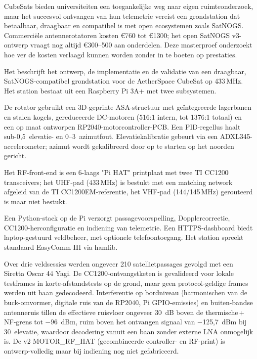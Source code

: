 
CubeSats bieden universiteiten een toegankelijke weg naar eigen ruimteonderzoek, maar het succesvol ontvangen van hun telemetrie vereist een grondstation dat betaalbaar, draagbaar en compatibel is met open ecosystemen zoals SatNOGS. Commerciële antennerotatoren kosten \euro{}760 tot \euro{}1300; het open SatNOGS v3-ontwerp vraagt nog altijd \euro{}300--500 aan onderdelen. Deze masterproef onderzoekt hoe ver de kosten verlaagd kunnen worden zonder in te boeten op prestaties.

Het beschrijft het ontwerp, de implementatie en de validatie van een draagbaar, SatNOGS-compatibel grondstation voor de AetherSpace CubeSat op 433\,MHz. Het station bestaat uit een Raspberry Pi 3A+ met twee subsystemen.

De rotator gebruikt een 3D-geprinte ASA-structuur met geïntegreerde lagerbanen en stalen kogels, gereduceerde DC-motoren (516:1 intern, tot 1376:1 totaal) en een op maat ontworpen RP2040-motorcontroller-PCB. Een PID-regellus haalt sub-0,5\degree\ elevatie- en 0--3\degree\ azimutfout. Elevatiekalibratie gebeurt via een ADXL345-accelerometer; azimut wordt gekalibreerd door op te starten op het noorden gericht.

Het RF-front-end is een 6-laags "Pi HAT" printplaat met twee TI CC1200 transceivers; het UHF-pad (433\,MHz) is bestukt met een matching network afgeleid van de TI CC1200EM-referentie, het VHF-pad (144/145\,MHz) gerouteerd is maar niet bestukt.

Een Python-stack op de Pi verzorgt passagevoorspelling, Dopplercorrectie, CC1200-herconfiguratie en indiening van telemetrie. Een HTTPS-dashboard biedt laptop-gestuurd veldbeheer, met optionele telefoontoegang. Het station spreekt standaard EasyComm III via hamlib.

Over drie veldsessies werden ongeveer 210 satellietpassages gevolgd met een Siretta Oscar 44 Yagi. De CC1200-ontvangstketen is gevalideerd voor lokale testframes in korte-afstandstests op de grond, maar geen protocol-geldige frames werden uit baan gedecodeerd. Interferentie op bordniveau (harmonischen van de buck-omvormer, digitale ruis van de RP2040, Pi GPIO-emissies) en buiten-bandse antenneruis tillen de effectieve ruisvloer ongeveer 30~dB boven de thermische\,+\,NF-grens tot $-$96~dBm, ruim boven het ontvangen signaal van $-$125{,}7~dBm bij 30\degree\ elevatie, waardoor decodering vanuit een baan zonder externe LNA onmogelijk is. De v2 MOTOR\_RF\_HAT (gecombineerde controller- en RF-print) is ontwerp-volledig maar bij indiening nog niet gefabriceerd.



